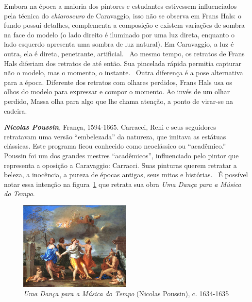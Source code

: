 Embora na época a maioria dos pintores e
estudantes estivessem influenciados pela técnica
do \textit{chiaroscuro} de Caravaggio, isso não se observa em Frans
Hals: o fundo possui detalhes, complementa a composição e existem
variações de sombra na face do modelo (o lado direito é iluminado por
uma luz direta, enquanto o lado esquerdo apresenta uma sombra de luz
natural). Em Caravaggio, a luz é outra, ela é direta, penetrante,
artificial.~\cite{gombrich} Ao mesmo tempo, os retratos de Frans Hals
diferiam dos retratos de até então. Sua pincelada rápida permitia
capturar não o modelo, mas o momento, o instante.~\cite{peter} Outra
diferença é a pose alternativa para a época. Diferente dos retratos
com olhares perdidos, Frans Hals usa os olhos do modelo para expressar
e compor o momento. Ao invés de um olhar perdido, Massa olha para algo
que lhe chama atenção, a ponto de virar-se na cadeira.

\textbf{\emph{Nicolas Poussin}}, França, 1594-1665. Carracci, Reni e
seus seguidores retratavam uma versão ``embelezada'' da natureza, que
imitava as estátuas clássicas. Este programa ficou conhecido como
neoclássico ou ``acadêmico.''~\cite{gombrich} Poussin foi um dos
grandes mestres ``acadêmicos'', influenciado pelo pintor que
representa a oposição a Caravaggio: Carracci. Suas pinturas querem
retratar a beleza, a inocência, a pureza de épocas antigas, seus mitos
e histórias.~\cite{unglaub} É possível notar essa intenção na
figura~\ref{fig:poussin:danca} que retrata sua obra \textit{Uma Dança
para a Música do Tempo}. 

\begin{figure}
  \begin{centering}
    \caption{\emph{Uma Dança para a Música do Tempo} (Nicolas Poussin), c. 1634-1635}
    \label{fig:poussin:danca}
    \includegraphics[width=0.5\textwidth]{figs/poussin_danca.png}
  \end{centering}  
\end{figure}


